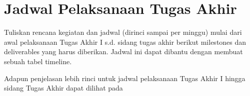 \section{Jadwal Pelaksanaan Tugas Akhir}

Tuliskan rencana kegiatan dan jadwal (dirinci sampai per minggu) mulai dari awal pelaksanaan Tugas Akhir I s.d. sidang tugas akhir berikut milestones dan deliverables yang harus diberikan. Jadwal ini dapat dibantu dengan membuat sebuah tabel timeline.



Adapun penjelasan lebih rinci untuk jadwal pelaksanaan Tugas Akhir I hingga sidang Tugas Akhir dapat dilihat pada \\


